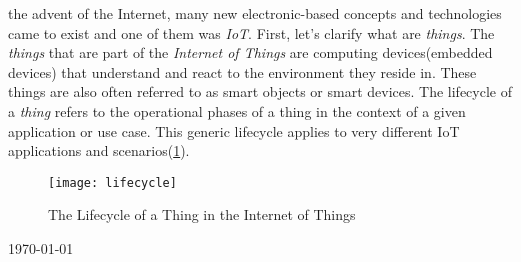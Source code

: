 \documentclass[10pt,journal,compsoc]{IEEEtran}
\begin{document}
	 the advent of the Internet, many new electronic-based concepts and technologies came to exist and one of them was \emph{IoT}.
	First, let's clarify what are  \emph{things}. The \emph{things} that are part of the \emph{Internet of Things} are computing
	devices(embedded devices\cite{rfc7452}) that understand and react to the environment they reside in.
	These things are also often referred to as smart objects or smart
	devices. The lifecycle of a \emph{thing} refers to the operational phases of a thing
	in the context of a given application or use case. This generic
	lifecycle applies to very different IoT applications and
	scenarios(\cref{thinglifecycle}).\cite{rfc8576}
	\begin{figure}[h]
		\texttt{[image: lifecycle]}
		\caption{The Lifecycle of a Thing in the Internet of Things \cite{rfc8576}}
		\label{thinglifecycle}
	\end{figure}


	\hfill \today
\end{document}
